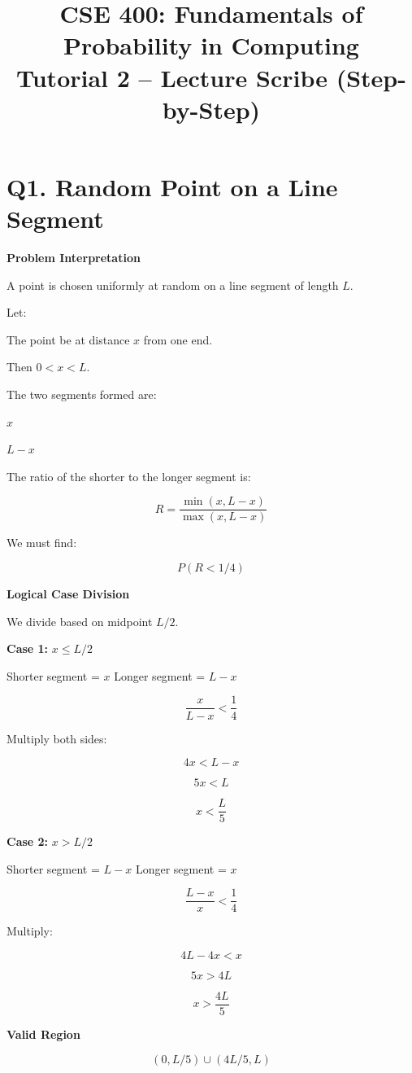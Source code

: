 \documentclass{article}
\begin{document}
\title{CSE 400: Fundamentals of Probability in Computing\\
Tutorial 2 – Lecture Scribe (Step-by-Step)}
\date{}
\maketitle

\section*{Q1. Random Point on a Line Segment}

\textbf{Problem Interpretation}

A point is chosen uniformly at random on a line segment of length $L$.

Let:

The point be at distance $x$ from one end.

Then $0 < x < L$.

The two segments formed are:

$x$

$L - x$

The ratio of the shorter to the longer segment is:

\[
R = \frac{\min(x, L-x)}{\max(x, L-x)}
\]

We must find:

\[
P(R < 1/4)
\]

\textbf{Logical Case Division}

We divide based on midpoint $L/2$.

\textbf{Case 1:} $x \le L/2$

Shorter segment = $x$  
Longer segment = $L - x$

\[
\frac{x}{L-x} < \frac{1}{4}
\]

Multiply both sides:

\[
4x < L - x
\]

\[
5x < L
\]

\[
x < \frac{L}{5}
\]

\textbf{Case 2:} $x > L/2$

Shorter segment = $L - x$  
Longer segment = $x$

\[
\frac{L-x}{x} < \frac{1}{4}
\]

Multiply:

\[
4L - 4x < x
\]

\[
5x > 4L
\]

\[
x > \frac{4L}{5}
\]

\textbf{Valid Region}

\[
(0, L/5) \cup (4L/5, L)
\]
\end{document}
